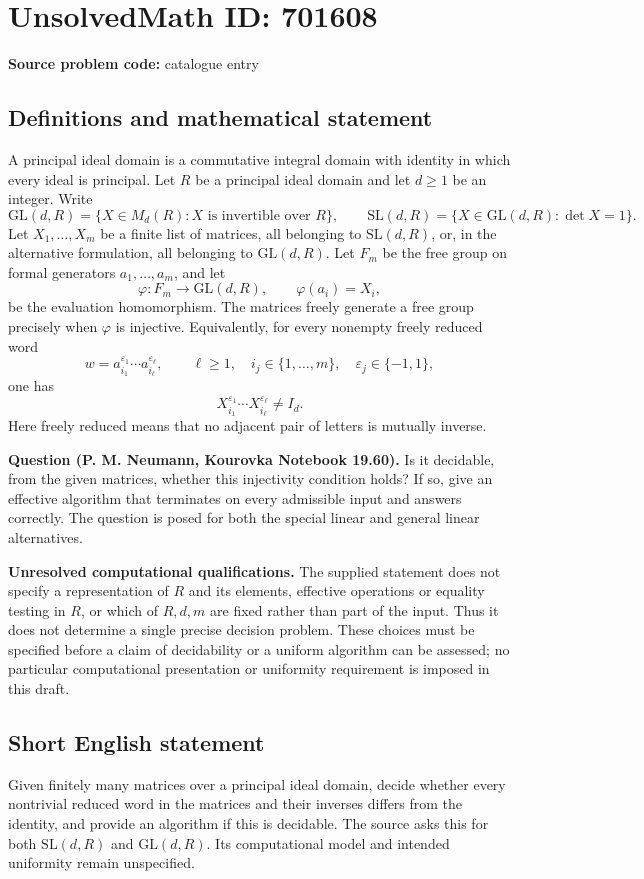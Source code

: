 \documentclass[11pt]{article}
\begin{document}
\section*{UnsolvedMath ID: 701608}
\textbf{Source problem code:} catalogue entry
\subsection{Definitions and mathematical statement}
A principal ideal domain is a commutative integral domain with identity in which every ideal is principal. Let \(R\) be a principal ideal domain and let \(d\geq 1\) be an integer. Write
\[
\mathrm{GL}(d,R)=\{X\in M_d(R):X\text{ is invertible over }R\},\qquad
\mathrm{SL}(d,R)=\{X\in\mathrm{GL}(d,R):\det X=1\}.
\]
Let \(X_1,\ldots,X_m\) be a finite list of matrices, all belonging to \(\mathrm{SL}(d,R)\), or, in the alternative formulation, all belonging to \(\mathrm{GL}(d,R)\). Let \(F_m\) be the free group on formal generators \(a_1,\ldots,a_m\), and let
\[
\varphi:F_m\longrightarrow\mathrm{GL}(d,R),\qquad \varphi(a_i)=X_i,
\]
be the evaluation homomorphism. The matrices freely generate a free group precisely when \(\varphi\) is injective. Equivalently, for every nonempty freely reduced word
\[
w=a_{i_1}^{\varepsilon_1}\cdots a_{i_\ell}^{\varepsilon_\ell},\qquad
\ell\geq1,\quad i_j\in\{1,\ldots,m\},\quad \varepsilon_j\in\{-1,1\},
\]
one has
\[
X_{i_1}^{\varepsilon_1}\cdots X_{i_\ell}^{\varepsilon_\ell}\ne I_d.
\]
Here freely reduced means that no adjacent pair of letters is mutually inverse.

\textbf{Question (P. M. Neumann, Kourovka Notebook 19.60).} Is it decidable, from the given matrices, whether this injectivity condition holds? If so, give an effective algorithm that terminates on every admissible input and answers correctly. The question is posed for both the special linear and general linear alternatives.

\textbf{Unresolved computational qualifications.} The supplied statement does not specify a representation of \(R\) and its elements, effective operations or equality testing in \(R\), or which of \(R,d,m\) are fixed rather than part of the input. Thus it does not determine a single precise decision problem. These choices must be specified before a claim of decidability or a uniform algorithm can be assessed; no particular computational presentation or uniformity requirement is imposed in this draft.
\subsection{Short English statement}
Given finitely many matrices over a principal ideal domain, decide whether every nontrivial reduced word in the matrices and their inverses differs from the identity, and provide an algorithm if this is decidable. The source asks this for both \(\mathrm{SL}(d,R)\) and \(\mathrm{GL}(d,R)\). Its computational model and intended uniformity remain unspecified.
\end{document}
